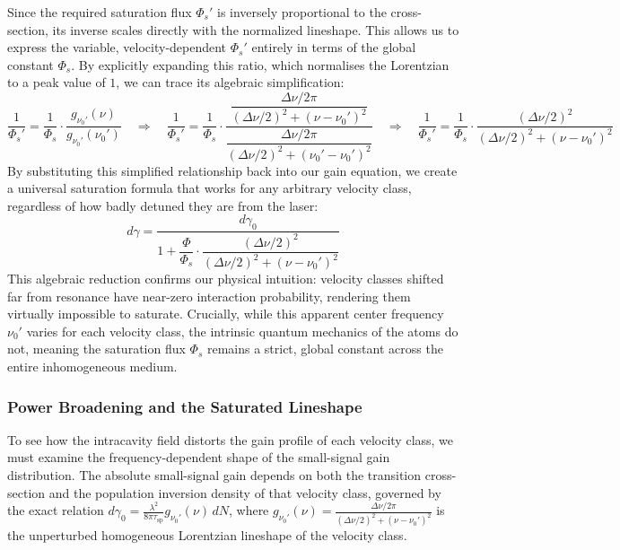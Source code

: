 Since the required saturation flux $\Phi_s'$ is inversely proportional to the cross-section, its inverse scales directly with the normalized lineshape. This allows us to express the variable, velocity-dependent $\Phi_s'$ entirely in terms of the global constant $\Phi_s$. By explicitly expanding this ratio, which normalises the Lorentzian to a peak value of $1$, we can trace its algebraic simplification:
\begin{equation*}
    \frac{1}{\Phi_s'} = \frac{1}{\Phi_s} \cdot \frac{g_{\nu_0'}(\nu)}{g_{\nu_0'}(\nu_0')} \quad\Rightarrow\quad \frac{1}{\Phi_s'} = \frac{1}{\Phi_s} \cdot \frac{\dfrac{\Delta\nu/2\pi}{(\Delta\nu/2)^2 + (\nu - \nu_0')^2}}{\dfrac{\Delta\nu/2\pi}{(\Delta\nu/2)^2 + (\nu_0' - \nu_0')^2}} \quad\Rightarrow\quad \frac{1}{\Phi_s'} = \frac{1}{\Phi_s} \cdot \frac{(\Delta\nu/2)^2}{(\Delta\nu/2)^2 + (\nu - \nu_0')^2}
\end{equation*}
By substituting this simplified relationship back into our gain equation, we create a universal saturation formula that works for any arbitrary velocity class, regardless of how badly detuned they are from the laser:
\begin{equation*}
    d\gamma = \frac{d\gamma_0}{1 + \dfrac{\Phi}{\Phi_s} \cdot \dfrac{(\Delta\nu/2)^2}{(\Delta\nu/2)^2 + (\nu - \nu_0')^2}}
\end{equation*}
This algebraic reduction confirms our physical intuition: velocity classes shifted far from resonance have near-zero interaction probability, rendering them virtually impossible to saturate. Crucially, while this apparent center frequency $\nu_0'$ varies for each velocity class, the intrinsic quantum mechanics of the atoms do not, meaning the saturation flux $\Phi_s$ remains a strict, global constant across the entire inhomogeneous medium.

\subsubsection*{Power Broadening and the Saturated Lineshape}

To see how the intracavity field distorts the gain profile of each velocity class, we must examine the frequency-dependent shape of the small-signal gain distribution. The absolute small-signal gain depends on both the transition cross-section and the population inversion density of that velocity class, governed by the exact relation $d\gamma_0 = \frac{\lambda^2}{8\pi\tau_{\mathrm{sp}}} g_{\nu_0'}(\nu) \, dN$, where $g_{\nu_0'}(\nu) = \frac{\Delta\nu/2\pi}{(\Delta\nu/2)^2 + (\nu - \nu_0')^2}$ is the unperturbed homogeneous Lorentzian lineshape of the velocity class.

